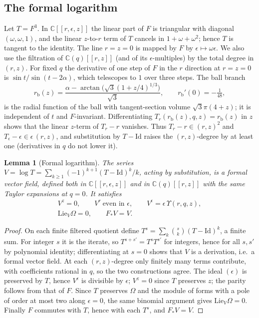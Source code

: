 \documentclass[11pt]{amsart}
\numberwithin{equation}{section}
\newtheorem{lemma}[theorem]{Lemma}
\theoremstyle{definition}
\theoremstyle{remark}
\newcommand{\C}{\mathbb{C}}
\newcommand{\rb}{r_{\mathrm b}}
\newcommand{\Id}{\mathrm{Id}}
\begin{document}
\subsection{The formal logarithm}
Let $T=F^3$. In $\C[[r,\epsilon,z]]$ the linear part of $F$ is triangular with diagonal $(\omega,\omega,1)$, and the linear $z$-to-$r$ term of $T$ cancels in $1+\omega+\omega^2$; hence $T$ is tangent to the identity. The line $r=z=0$ is mapped by $F$ by $\epsilon\mapsto\omega\epsilon$. We also use the filtration of $\C(q)[[r,z]]$ (and of its $\epsilon$-multiples) by the total degree in $(r,z)$. For fixed $q$ the derivative of one step of $F$ in the $r$ direction at $r=z=0$ is $\sin t/\sin(t-2\alpha)$, which telescopes to $1$ over three steps. The ball branch
\begin{equation}\label{eq:ball}
\rb(z)=\frac{\alpha-\arctan\bigl(\sqrt3(1+z/4)^{1/3}\bigr)}{\sqrt3},\qquad \rb'(0)=-\tfrac1{48},
\end{equation}
is the radial function of the ball with tangent-section volume $\sqrt3\pi(4+z)$; it is independent of $t$ and $F$-invariant. Differentiating $T_r(\rb(z),q,z)=\rb(z)$ in $z$ shows that the linear $z$-term of $T_r-r$ vanishes. Thus $T_r-r\in(r,z)^2$ and $T_\epsilon-\epsilon\in\epsilon\,(r,z)$, and substitution by $T-\Id$ raises the $(r,z)$-degree by at least one (derivatives in $q$ do not lower it).

\begin{lemma}[Formal logarithm]\label{lem:log}
The series $V=\log T=\sum_{k\ge1}(-1)^{k+1}(T-\Id)^k/k$, acting by substitution, is a formal vector field, defined both in $\C[[r,\epsilon,z]]$ and in $\C(q)[[r,z]]$ with the same Taylor expansions at $q=0$. It satisfies
\begin{gather*}
V^z=0,\qquad V^r\ \text{even in }\epsilon,\qquad V^\epsilon=\epsilon\,\Upsilon(r,q,z),\\
\mathrm{Lie}_V\Omega=0,\qquad F_*V=V.
\end{gather*}
\end{lemma}

\begin{proof}
On each finite filtered quotient define $T^s=\sum_k\binom sk(T-\Id)^k$, a finite sum. For integer $s$ it is the iterate, so $T^{s+s'}=T^sT^{s'}$ for integers, hence for all $s,s'$ by polynomial identity; differentiating at $s=0$ shows that $V$ is a derivation, i.e.\ a formal vector field. At each $(r,z)$-degree only finitely many terms contribute, with coefficients rational in $q$, so the two constructions agree. The ideal $(\epsilon)$ is preserved by $T$, hence $V^\epsilon$ is divisible by $\epsilon$; $V^z=0$ since $T$ preserves $z$; the parity follows from that of $F$. Since $T$ preserves $\Omega$ and the module of forms with a pole of order at most two along $\epsilon=0$, the same binomial argument gives $\mathrm{Lie}_V\Omega=0$. Finally $F$ commutes with $T$, hence with each $T^s$, and $F_*V=V$.
\end{proof}
\end{document}
